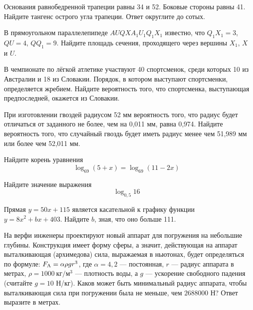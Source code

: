 



\cleardoublepage
\def\examvart{Вариант 14.1}
\normalsize

\startpartone
\large




\begin{taskBN}{1}
Основания равнобедренной трапеции равны 34 и 52. Боковые стороны равны 41. Найдите тангенс острого угла трапеции. Ответ округлите до сотых.
\end{taskBN}

\begin{taskBN}{2}
В прямоугольном параллелепипеде  $AUQXA_{1}U_{1}Q_{1}X_{1}$  известно, что  $Q_{1}X_{1} = 3$, $QU = 4$, $QQ_{1} = 9$. Найдите площадь сечения, проходящего через вершины $X_{1}$, $X$ и $U$.
\end{taskBN}

\begin{taskBN}{3}
В чемпионате по лёгкой атлетике участвуют 40 спортсменок, среди которых 10 из Австралии и 18 из Словакии. Порядок, в котором выступают спортсменки, определяется жребием. Найдите вероятность того, что спортсменка, выступающая предпоследней, окажется из Словакии.
\end{taskBN}

\begin{taskBN}{4}
При изготовлении гвоздей радиусом 52 мм вероятность того, что радиус будет отличаться от заданного не более, чем на 0,011 мм, равна 0,974. Найдите вероятность того, что случайный гвоздь будет иметь радиус менее чем 51,989 мм или более чем 52,011 мм.
\end{taskBN}

\begin{taskBN}{5}
Найдите корень уравнения $$\log_{69}{(5+x)}=\log_{69}{(11-2x)}$$
\end{taskBN}

\begin{taskBN}{6}
Найдите значение выражения $$ \log_{0,5}16 $$
\end{taskBN}

\begin{taskBN}{7}
Прямая $y=50x+115$ является касательной к графику функции $y=8x^{2}+bx+403$. Найдите $b$, зная, что оно больше 111.
\end{taskBN}

\begin{taskBN}{8}
На верфи инженеры проектируют новый аппарат для погружения на небольшие глубины. Конструкция имеет форму сферы, а значит, действующая на аппарат выталкивающая (архимедова) сила, выражаемая в ньютонах, будет определяться по формуле:  $F_{\rm{A}}  = \alpha \rho gr^3$, где $\alpha  = 4,2$ — постоянная, $r$ — радиус аппарата в метрах, $\rho  = 1000~\mbox{кг}/\mbox{м}^3$ — плотность воды, а $g$ — ускорение свободного падения (считайте $g = 10$ Н/кг). Каков может быть минимальный радиус аппарата, чтобы выталкивающая сила при погружении была не меньше, чем $2688000$ Н? Ответ выразите в метрах.
\end{taskBN}

